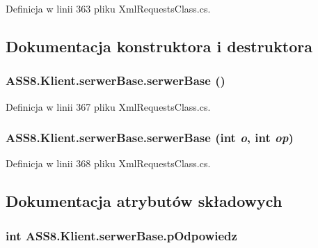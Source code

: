 Definicja w linii 363 pliku XmlRequestsClass.cs.

\subsection{Dokumentacja konstruktora i destruktora}
\hypertarget{a00023_03b6c0fe53e451d71bb621b6708ea20a}{
\subsubsection[{serwerBase}]{\setlength{\rightskip}{0pt plus 5cm}ASS8.Klient.serwerBase.serwerBase ()}}
\label{d3/d52/a00023_03b6c0fe53e451d71bb621b6708ea20a}




Definicja w linii 367 pliku XmlRequestsClass.cs.\hypertarget{a00023_0e5b05356082c0a469a2cd3ef53db565}{
\subsubsection[{serwerBase}]{\setlength{\rightskip}{0pt plus 5cm}ASS8.Klient.serwerBase.serwerBase (int {\em o}, \/  int {\em op})}}
\label{d3/d52/a00023_0e5b05356082c0a469a2cd3ef53db565}




Definicja w linii 368 pliku XmlRequestsClass.cs.

\subsection{Dokumentacja atrybutów składowych}
\hypertarget{a00023_78106818c3204874ec7767295f8c664d}{
\subsubsection[{pOdpowiedz}]{\setlength{\rightskip}{0pt plus 5cm}int {\bf ASS8.Klient.serwerBase.pOdpowiedz}}}
\label{d3/d52/a00023_78106818c3204874ec7767295f8c664d}




